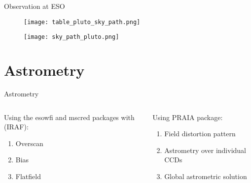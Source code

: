 \begin{frame}[t]{Observation at ESO}

\end{frame}


\begin{frame}
		\begin{figure}[tb]
			\centering
			\texttt{[image: table\_pluto\_sky\_path.png]}
		\end{figure}
\end{frame}



\begin{frame}
		\begin{figure}[tb]
			\centering
			\texttt{[image: sky\_path\_pluto.png]}
		\end{figure}
\end{frame}


\section{Astrometry}
\begin{frame}[c]{Astrometry}{}
	\begin{columns}[t]
	\begin{column}[T]{5cm}
	Using the esowfi and mscred packages with (IRAF):
	\begin{enumerate}
		\item Overscan
		\item Bias
		\item Flatfield
	\end{enumerate}
	\end{column}
	\begin{column}[T]{5cm}
	Using PRAIA package:
		\begin{enumerate}
			\item Field distortion pattern
			\item Astrometry over individual CCDs
			\item Global astrometric solution
		\end{enumerate}
	\end{column}
	\end{columns}
	
\end{frame}

